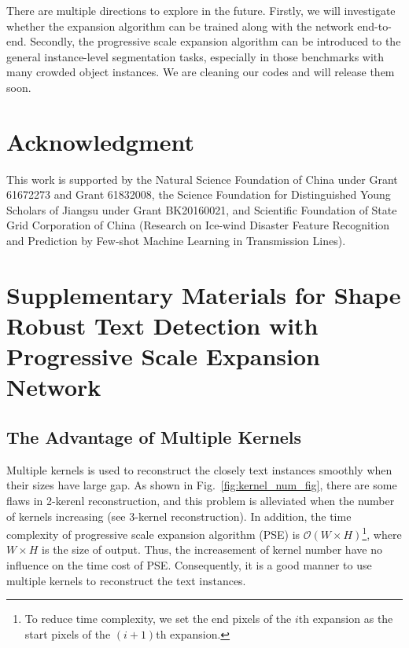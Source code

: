 \documentclass[10pt,twocolumn,letterpaper]{article}
\begin{document}
	There are multiple directions to explore in the future. Firstly, we will investigate whether the expansion algorithm can be trained along with the network end-to-end. Secondly, the progressive scale expansion algorithm can be introduced to the general instance-level segmentation tasks, especially in those benchmarks with many crowded object instances. We are cleaning our codes and will release them soon.
	
	\section{Acknowledgment}
	This work is supported by the Natural Science Foundation of China under Grant 61672273 and Grant 61832008, the Science Foundation for Distinguished Young Scholars of Jiangsu under Grant BK20160021, and Scientific Foundation of State Grid Corporation of China (Research on Ice-wind Disaster Feature Recognition and Prediction by Few-shot Machine Learning in Transmission Lines).

\section{Supplementary Materials for Shape Robust Text Detection with Progressive Scale Expansion Network}

\subsection{The Advantage of Multiple Kernels}
	Multiple kernels is used to reconstruct the closely text instances smoothly 
	when their sizes have large gap. As shown in Fig.~\ref{fig:kernel_num_fig}, there are some flaws in 2-kerenl reconstruction, and this problem is alleviated when the number of kernels increasing (see 3-kernel reconstruction).
	In addition, the time complexity of progressive scale expansion algorithm (PSE) is $\mathcal{O}(W \times H)$\footnote{To reduce time complexity, we set the end pixels of the $i$th expansion as the start pixels of the $(i+1)$th expansion.}, where $W \times H$ is the size of output.
	Thus, the increasement of kernel number have no influence on the time cost of PSE. Consequently, it is a good manner to use multiple kernels to reconstruct the text instances.
	
\end{document}
